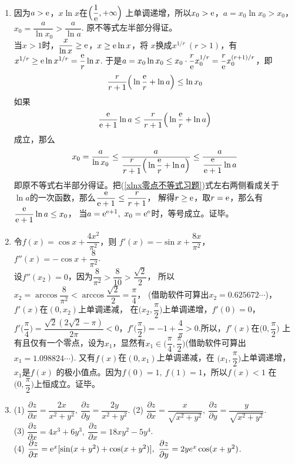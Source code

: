 \begin{enumerate}[label={\textbf{\arabic*.}},leftmargin=
    \inteval{\myenumleftmargin}pt]
\item 
因为$ a>\mathrm{e} $，$ x\ln x $在$ \Big(\dfrac{1}{\mathrm{e}},+\infty\Big) $
上单调递增，所以$ x_0>\mathrm{e} $，$ a=x_0\ln x_0>x_0 $，$ x_0=\dfrac{a}{\ln x_0}
>\dfrac{a}{\ln a} $. 原不等式左半部分得证。\\
当$ x>1 $时，$ \dfrac{x}{\ln x}\geq \mathrm{e} $，$ x\geq \mathrm{e}\ln x $，将
$ x $换成$ x^{1/r}\ (r>1) $，有$ x^{1/r}\geq \mathrm{e}\ln x^{1/r}=\dfrac{\mathrm{e}}{r}\ln x $.
于是$ a=x_0\ln x_0\leq x_0\cdot \dfrac{r}{\mathrm{e}}x_0^{1/r}=\dfrac{r}{\mathrm{e}}
x_0^{(r+1)/r} $，即
\begin{gather*}
    \dfrac{r}{r+1}\Big(\ln\dfrac{\mathrm{e}}{r}+\ln a\Big)\leq \ln x_0
\end{gather*}
如果
\begin{gather}\label{xlnx零点不等式习题}
    \dfrac{\mathrm{e}}{\mathrm{e}+1}\ln a\leq \dfrac{r}{r+1}\Big(\ln\dfrac{\mathrm{e}}{r}+\ln a\Big)
\end{gather}
成立，那么
\begin{gather*}
    x_0=\dfrac{a}{\ln x_0}\leq \dfrac{a}{\dfrac{r}{r+1}\Big(
        \ln\dfrac{\mathrm{e}}{r}+\ln a\Big)} 
    \leq \dfrac{a}{\dfrac{\mathrm{e}}{\mathrm{e}+1}\ln a}
\end{gather*}
即原不等式右半部分得证。把(\ref{xlnx零点不等式习题})式左右两侧看成关于
$ \ln a $的一次函数，那么$ \dfrac{\mathrm{e}}{\mathrm{e}+1}\leq \dfrac{r}{r+1} $，
解得$ r\geq \mathrm{e} $，取$ r=\mathrm{e} $，那么有$ \dfrac{\mathrm{e}}{\mathrm{e}+1}\ln a\leq x_0 $，
当$ a=\e^{\e+1},\ x_0=\e^{\e} $时，等号成立。证毕。

\item 
令$ f(x)=\cos x+\dfrac{4x^2}{\pi^2} $，则
$ f'(x) =-\sin x+\dfrac{8x}{\pi^2} $，
$ f''(x)=-\cos x+\dfrac{8}{\pi^2} $.\\
设$ f''(x_2)=0 $，因为$ \dfrac{8}{\pi^2}>\dfrac{8}{10}>\dfrac{\sqrt{2}}{2} $，
所以$ x_2=\arccos\dfrac{8}{\pi^2}<\arccos\dfrac{\sqrt{2}}{2}=\dfrac{\pi}{4} $，
(借助软件可算出$ x_2=0.625672\cdots $)，$ f'(x) $在$ (0,x_2) $上单调递减，
在$ \Big(x_2,\dfrac{\pi}{2}\Big) $上单调递增，$ f'(0)=0 $，
$ f'\Big(\dfrac{\pi}{4}\Big)
=\dfrac{\sqrt{2}(2\sqrt{2}-\pi)}{2\pi}<0 $，$ f'\Big(\dfrac{\pi}{2}\Big)
=-1+\dfrac{4}{\pi}>0 $.所以，$ f'(x) $在$ \big(0,\dfrac{\pi}{2}\big) $
上有且仅有一个零点，设为$ x_1 $，显然有$ x_1\in\Big(\dfrac{\pi}{4},
\dfrac{\pi}{2}\Big) $(借助软件可算出$ x_1=1.098824\cdots $).
又有$ f(x) $在$ (0,x_1) $上单调递减，在
$ \Big(x_1,\dfrac{\pi}{2}\Big) $上单调递增，$ x_1 $是$ f(x) $
的极小值点。因为$ f(0)=1,\ f(1)=1 $，所以$ f(x)<1 $
在$ \Big(0,\dfrac{\pi}{2}\Big) $上恒成立。证毕。

\item 
(1) $ \dfrac{\partial z}{\partial x}=\dfrac{2x}{x^2+y^2},\ 
\dfrac{\partial z}{\partial y}=\dfrac{2y}{x^2+y^2} $. \quad
(2) $ \dfrac{\partial z}{\partial x}=\dfrac{x}{\sqrt{x^2+y^2}},\ 
\dfrac{\partial z}{\partial y}=\dfrac{y}{\sqrt{x^2+y^2}} $. \\
(3) $ \dfrac{\partial z}{\partial x}=4x^3+6y^3,\ 
\dfrac{\partial z}{\partial x}=18xy^2-5y^4 $. \\
(4) $ \dfrac{\partial z}{\partial x}=\e^x[\sin(x+y^2)+\cos(x+y^2)],\ 
\dfrac{\partial z}{\partial y}=2ye^x \cos(x+y^2) $. 


\end{enumerate}
